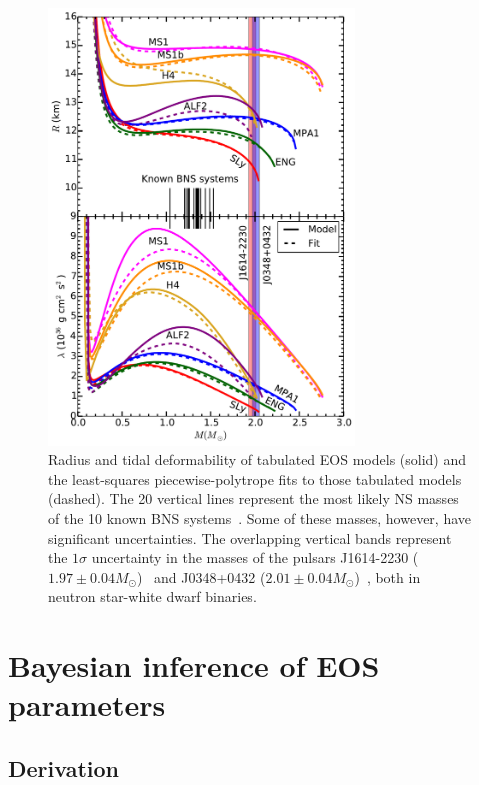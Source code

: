 \documentclass[twocolumn,prd,amssymb,aps,nofootinbib,showpacs,epsf]{revtex4}
\begin{document}
\begin{figure}[!htb]
\begin{center}
\includegraphics[width=3.2in]{Radiuslambda.pdf}
\caption{Radius and tidal deformability of tabulated EOS models (solid) and the least-squares piecewise-polytrope fits to those tabulated models (dashed). The 20 vertical lines represent the most likely NS masses of the 10 known BNS systems~\cite{Lattimer2012}. Some of these masses, however, have significant uncertainties. The overlapping vertical bands represent the $1\sigma$ uncertainty in the masses of the pulsars J1614-2230 ($1.97\pm0.04M_\odot$)~\cite{DemorestPennucciRansom2010} and J0348+0432 ($2.01\pm0.04M_\odot$)~\cite{AntoniadisFreireWex2013}, both in neutron star-white dwarf binaries.}
\label{fig:rlofm}
\end{center}
\end{figure}


\section{Bayesian inference of EOS parameters}
\label{sec:bayes}

\subsection{Derivation}
\end{document}
